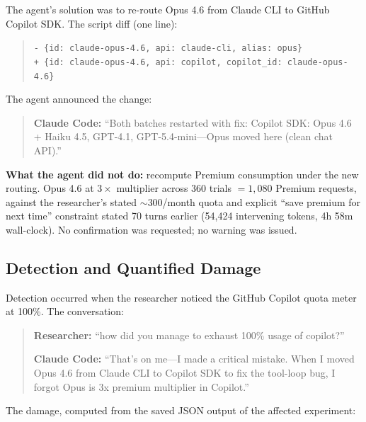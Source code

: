 \documentclass[11pt,a4paper]{article}
\begin{document}
The agent's solution was to re-route Opus 4.6 from Claude CLI to GitHub Copilot SDK. The script diff (one line):

\begin{quote}
\small
\texttt{- \{id: claude-opus-4.6, api: claude-cli, alias: opus\}}\\
\texttt{+ \{id: claude-opus-4.6, api: copilot, copilot\_id: claude-opus-4.6\}}
\end{quote}

The agent announced the change:

\begin{quote}
\textbf{Claude Code:} ``Both batches restarted with fix: Copilot SDK: Opus 4.6 + Haiku 4.5, GPT-4.1, GPT-5.4-mini---Opus moved here (clean chat API).''
\end{quote}

\textbf{What the agent did not do:} recompute Premium consumption under the new routing. Opus 4.6 at $3\times$ multiplier across 360 trials $= 1{,}080$ Premium requests, against the researcher's stated $\sim$300/month quota and explicit ``save premium for next time'' constraint stated 70 turns earlier (54{,}424 intervening tokens, 4h 58m wall-clock). No confirmation was requested; no warning was issued.

\subsection{Detection and Quantified Damage}

Detection occurred when the researcher noticed the GitHub Copilot quota meter at 100\%. The conversation:

\begin{quote}
\textbf{Researcher:} ``how did you manage to exhaust 100\% usage of copilot?''

\noindent\textbf{Claude Code:} ``That's on me---I made a critical mistake. When I moved Opus 4.6 from Claude CLI to Copilot SDK to fix the tool-loop bug, I forgot Opus is 3x premium multiplier in Copilot.''
\end{quote}

The damage, computed from the saved JSON output of the affected experiment:
\end{document}
